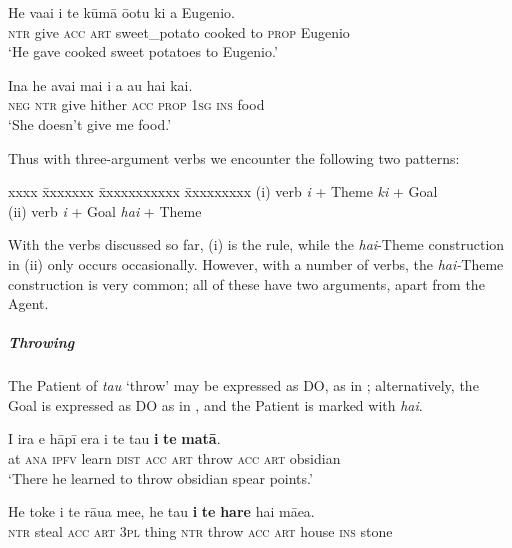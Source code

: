 \ea\label{ex:8.134}
\gll He va{\ꞌ}ai i te kūmā {\ꞌ}ō{\ꞌ}otu ki a Eugenio. \\
\textsc{ntr} give \textsc{acc} \textsc{art} sweet\_potato cooked to \textsc{prop} Eugenio \\

\glt 
‘He gave cooked sweet potatoes to Eugenio.’ \textstyleExampleref{[R231.132]} 
\z

\ea\label{ex:8.135}
\gll {\ꞌ}Ina he {\ꞌ}avai mai i a au hai kai.\\
\textsc{neg} \textsc{ntr} give hither \textsc{acc} \textsc{prop} \textsc{1sg} \textsc{ins} food\\

\glt
‘She doesn’t give me food.’ \textstyleExampleref{[R229.414]} 
\z

Thus with three-argument verbs we encounter the following two patterns: 

\ea
\begin{tabbing}
xxxx \= xxxxxxx \= xxxxxxxxxxx \= xxxxxxxxx\kill
(i) \>  verb  \> \textit{i} + Theme  \> \textit{ki} + Goal\\
(ii) \>  verb  \> \textit{i} + Goal\textsubscript{}  \> \textit{hai} + Theme
\end{tabbing}
\z
With the verbs discussed so far, (i) is the rule, while the \textit{hai}{}-Theme construction in (ii) only occurs occasionally. However, with a number of verbs, the \textit{hai-}Theme construction is very common; all of these have two arguments, apart from the Agent.

\subparagraph{Throwing} The Patient of \textit{tau} ‘throw’ may be expressed as DO, as in ; alternatively, the Goal is expressed as DO as in , and the Patient is marked with \textit{hai}.

\ea\label{ex:8.136}
\gll {\ꞌ}I ira e hāpī era i te tau \textbf{i} \textbf{te} \textbf{matā}. \\
at \textsc{ana} \textsc{ipfv} learn \textsc{dist} \textsc{acc} \textsc{art} throw \textsc{acc} \textsc{art} obsidian \\

\glt 
‘There he learned to throw obsidian spear points.’ \textstyleExampleref{[R304.003]} 
\z

\ea\label{ex:8.137}
\gll He toke i te rāua me{\ꞌ}e, he tau \textbf{i} \textbf{te} \textbf{hare} hai mā{\ꞌ}ea. \\
\textsc{ntr} steal \textsc{acc} \textsc{art} \textsc{3pl} thing \textsc{ntr} throw \textsc{acc} \textsc{art} house \textsc{ins} stone \\

